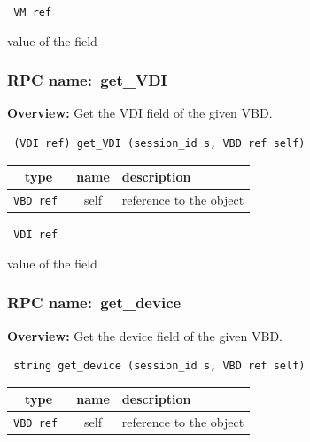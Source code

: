 \vspace{0.3cm}

{\tt 
VM ref
}


value of the field
\vspace{0.3cm}
\vspace{0.3cm}
\vspace{0.3cm}
\subsubsection{RPC name:~get\_VDI}

{\bf Overview:} 
Get the VDI field of the given VBD.

\begin{verbatim} (VDI ref) get_VDI (session_id s, VBD ref self)\end{verbatim}



 
\vspace{0.3cm}
\begin{tabular}{|c|c|p{7cm}|}
 \hline
{\bf type} & {\bf name} & {\bf description} \\ \hline
{\tt VBD ref } & self & reference to the object \\ \hline 

\end{tabular}

\vspace{0.3cm}

{\tt 
VDI ref
}


value of the field
\vspace{0.3cm}
\vspace{0.3cm}
\vspace{0.3cm}
\subsubsection{RPC name:~get\_device}

{\bf Overview:} 
Get the device field of the given VBD.

\begin{verbatim} string get_device (session_id s, VBD ref self)\end{verbatim}



 
\vspace{0.3cm}
\begin{tabular}{|c|c|p{7cm}|}
 \hline
{\bf type} & {\bf name} & {\bf description} \\ \hline
{\tt VBD ref } & self & reference to the object \\ \hline 

\end{tabular}

